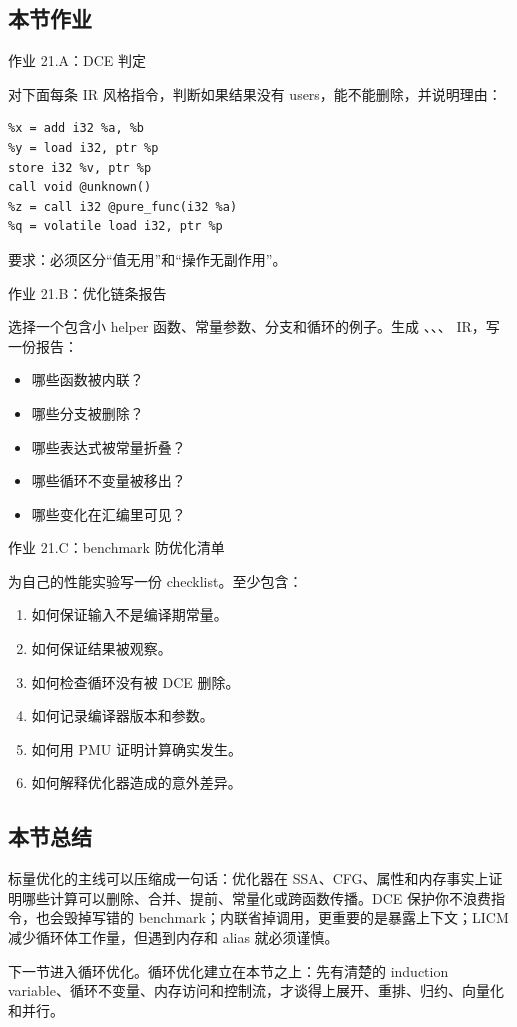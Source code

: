 \subsection{本节作业}

\begin{exercisebox}
作业 21.A：DCE 判定

对下面每条 IR 风格指令，判断如果结果没有 users，能不能删除，并说明理由：

\begin{lstlisting}
%x = add i32 %a, %b
%y = load i32, ptr %p
store i32 %v, ptr %p
call void @unknown()
%z = call i32 @pure_func(i32 %a)
%q = volatile load i32, ptr %p
\end{lstlisting}

要求：必须区分“值无用”和“操作无副作用”。
\end{exercisebox}

\begin{exercisebox}
作业 21.B：优化链条报告

选择一个包含小 helper 函数、常量参数、分支和循环的例子。生成 、、、 IR，写一份报告：

\begin{itemize}
  \item 哪些函数被内联？
  \item 哪些分支被删除？
  \item 哪些表达式被常量折叠？
  \item 哪些循环不变量被移出？
  \item 哪些变化在汇编里可见？
\end{itemize}
\end{exercisebox}

\begin{exercisebox}
作业 21.C：benchmark 防优化清单

为自己的性能实验写一份 checklist。至少包含：

\begin{enumerate}
  \item 如何保证输入不是编译期常量。
  \item 如何保证结果被观察。
  \item 如何检查循环没有被 DCE 删除。
  \item 如何记录编译器版本和参数。
  \item 如何用 PMU 证明计算确实发生。
  \item 如何解释优化器造成的意外差异。
\end{enumerate}
\end{exercisebox}

\subsection{本节总结}

标量优化的主线可以压缩成一句话：优化器在 SSA、CFG、属性和内存事实上证明哪些计算可以删除、合并、提前、常量化或跨函数传播。DCE 保护你不浪费指令，也会毁掉写错的 benchmark；内联省掉调用，更重要的是暴露上下文；LICM 减少循环体工作量，但遇到内存和 alias 就必须谨慎。

下一节进入循环优化。循环优化建立在本节之上：先有清楚的 induction variable、循环不变量、内存访问和控制流，才谈得上展开、重排、归约、向量化和并行。
